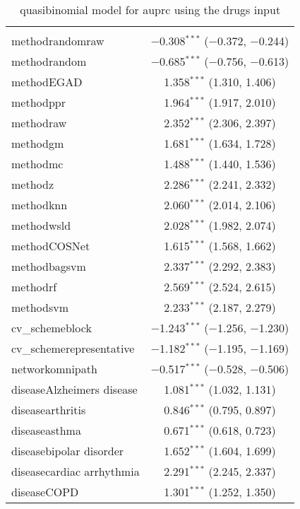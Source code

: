 
\begin{table}[!htbp] \centering 
  \caption{quasibinomial model for auprc using the drugs input} 
  \label{} 
\begin{tabular}{@{\extracolsep{5pt}}lc} 
\\[-1.8ex]\hline 
\hline \\[-1.8ex] 
 methodrandomraw & $-$0.308$^{***}$ ($-$0.372, $-$0.244) \\ 
  methodrandom & $-$0.685$^{***}$ ($-$0.756, $-$0.613) \\ 
  methodEGAD & 1.358$^{***}$ (1.310, 1.406) \\ 
  methodppr & 1.964$^{***}$ (1.917, 2.010) \\ 
  methodraw & 2.352$^{***}$ (2.306, 2.397) \\ 
  methodgm & 1.681$^{***}$ (1.634, 1.728) \\ 
  methodmc & 1.488$^{***}$ (1.440, 1.536) \\ 
  methodz & 2.286$^{***}$ (2.241, 2.332) \\ 
  methodknn & 2.060$^{***}$ (2.014, 2.106) \\ 
  methodwsld & 2.028$^{***}$ (1.982, 2.074) \\ 
  methodCOSNet & 1.615$^{***}$ (1.568, 1.662) \\ 
  methodbagsvm & 2.337$^{***}$ (2.292, 2.383) \\ 
  methodrf & 2.569$^{***}$ (2.524, 2.615) \\ 
  methodsvm & 2.233$^{***}$ (2.187, 2.279) \\ 
  cv\_schemeblock & $-$1.243$^{***}$ ($-$1.256, $-$1.230) \\ 
  cv\_schemerepresentative & $-$1.182$^{***}$ ($-$1.195, $-$1.169) \\ 
  networkomnipath & $-$0.517$^{***}$ ($-$0.528, $-$0.506) \\ 
  diseaseAlzheimers disease & 1.081$^{***}$ (1.032, 1.131) \\ 
  diseasearthritis & 0.846$^{***}$ (0.795, 0.897) \\ 
  diseaseasthma & 0.671$^{***}$ (0.618, 0.723) \\ 
  diseasebipolar disorder & 1.652$^{***}$ (1.604, 1.699) \\ 
  diseasecardiac arrhythmia & 2.291$^{***}$ (2.245, 2.337) \\ 
  diseaseCOPD & 1.301$^{***}$ (1.252, 1.350) \\ 

\end{tabular}
\end{table}
